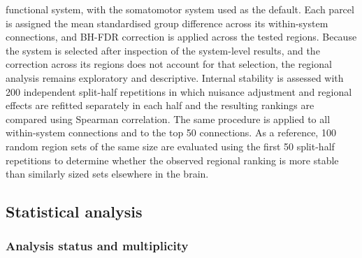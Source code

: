 functional system, with the somatomotor system used as the default. Each parcel is assigned the mean standardised group difference across its within-system connections, and BH-FDR correction is applied across the tested regions. Because the system is selected after inspection of the system-level results, and the correction across its regions does not account for that selection, the regional analysis remains exploratory and descriptive. Internal stability is assessed with 200 independent split-half repetitions in which nuisance adjustment and regional effects are refitted separately in each half and the resulting rankings are compared using Spearman correlation. The same procedure is applied to all within-system connections and to the top 50 connections. As a reference, 100 random region sets of the same size are evaluated using the first 50 split-half repetitions to determine whether the observed regional ranking is more stable than similarly sized sets elsewhere in the brain.

\subsection{Statistical analysis}
\label{subsec:statistical-analysis}

\subsubsection{Analysis status and multiplicity}
\label{subsubsec:analysis-status}

